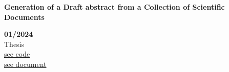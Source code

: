 \begin{minipage}{0.8\textwidth}
    \parbox{0.8\linewidth}{\textbf{Generation of a Draft abstract from a Collection of Scientific Documents}}  \hfill  \textbf{01/2024}\\
    Thesis\\
    \href{https://github.com/JavierOramas/thesis_experiments}{see code}\\
    \href{https://github.com/JavierOramas/thesis}{see document}\\
    \end{minipage} \hfill {}\\\\
